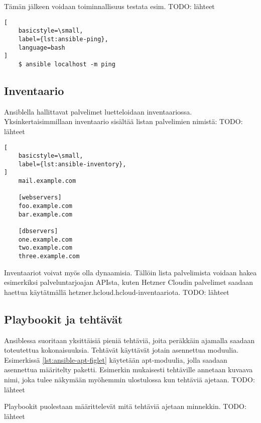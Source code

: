 Tämän jälkeen voidaan toiminnallisuus testata esim.
TODO: lähteet

\begin{lstlisting}[
    basicstyle=\small,
    label={lst:ansible-ping},
    language=bash
]
    $ ansible localhost -m ping
\end{lstlisting}

\subsection{Inventaario}

Ansiblella hallittavat palvelimet luetteloidaan inventaariossa.
Yksinkertaisimmillaan inventaario sisältää listan palvelimien nimistä:
TODO: lähteet

\begin{lstlisting}[
    basicstyle=\small,
    label={lst:ansible-inventory},
]
    mail.example.com

    [webservers]
    foo.example.com
    bar.example.com

    [dbservers]
    one.example.com
    two.example.com
    three.example.com
\end{lstlisting}

Inventaariot voivat myös olla dynaamisia. Tällöin lista palvelimista
voidaan hakea esimerkiksi palveluntarjoajan APIsta, kuten Hetzner Cloudin
palvelimet saadaan haettua käytätmällä hetzner.hcloud.hcloud-inventaariota.
TODO: lähteet

\subsection{Playbookit ja tehtävät}

Ansiblessa suoritaan yksittäisiä pieniä tehtäviä, joita peräkkäin ajamalla
saadaan toteutettua kokonaisuuksia. Tehtävät käyttävät jotain asennettua
moduulia. Esimerkissä \ref{lst:ansible-apt-figlet} käytetään apt-moduulia,
jolla saadaan asennettua määritelty paketti. Esimerkin mukaisesti tehtäville
annetaan kuvaava nimi, joka tulee näkymään myöhemmin ulostulossa kun
tehtäviä ajetaan.
TODO: lähteet



Playbookit puolestaan määrittelevät mitä tehtäviä ajetaan minnekkin.
TODO: lähteet



